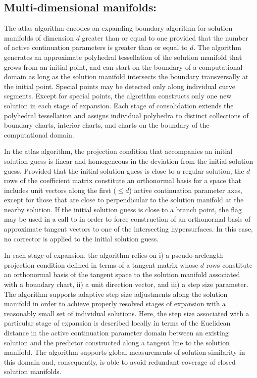 \subsection{Multi-dimensional manifolds: }

The  atlas algorithm encodes an expanding boundary algorithm for solution manifolds of dimension $d$ greater than or equal to one provided that the number of active continuation parameters is greater than or equal to $d$. The algorithm generates an approximate polyhedral tessellation of the solution manifold that grows from an initial point, and can start on the boundary of a computational domain as long as the solution manifold intersects the boundary transversally at the initial point. Special points may be detected only along individual curve segments. Except for special points, the algorithm constructs only one new solution in each stage of expansion. Each stage of consolidation extends the polyhedral tessellation and assigns individual polyhedra to distinct collections of boundary charts, interior charts, and charts on the boundary of the computational domain.

In the  atlas algorithm, the projection condition that accompanies an initial solution guess is linear and homogeneous in the deviation from the initial solution guess. Provided that the initial solution guess is close to a regular solution, the $d$ rows of the coefficient matrix constitute an orthonormal basis for a space that includes unit vectors along the first ($\le d$) active continuation parameter axes, except for those that are close to perpendicular to the solution manifold at the nearby solution. If the initial solution guess is close to a branch point, the  flag may be used in a call to  in order to force construction of an orthonormal basis of approximate tangent vectors to one of the intersecting hypersurfaces. In this case, no corrector is applied to the initial solution guess.

In each stage of expansion, the  algorithm relies on i) a pseudo-arclength projection condition defined in terms of a tangent matrix whose $d$ rows constitute an orthonormal basis of the tangent space to the solution manifold associated with a boundary chart, ii) a unit direction vector, and iii) a step size parameter. The algorithm supports adaptive step size adjustments along the solution manifold in order to achieve properly resolved stages of expansion with a reasonably small set of individual solutions. Here, the step size associated with a particular stage of expansion is described locally in terms of the Euclidean distance in the active continuation parameter domain between an existing solution and the predictor constructed along a tangent line to the solution manifold. The algorithm supports global measurements of solution similarity in this domain and, consequently, is able to avoid redundant coverage of closed solution manifolds.

